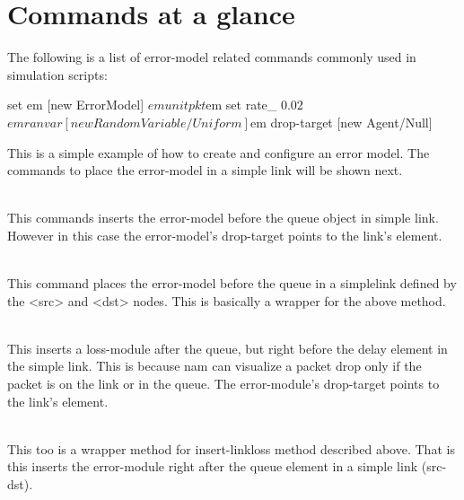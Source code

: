 \section{Commands at a glance}
\label{sec:errmodelcommand}

The following is a list of error-model related commands commonly used in
simulation scripts:

\begin{program}
set em [new ErrorModel]
$em unit pkt
$em set rate_ 0.02
$em ranvar [new RandomVariable/Uniform]
$em drop-target [new Agent/Null]
\end{program}

This is a simple example of how to create and configure an error model.
The commands to place the error-model in a simple link will be shown next.

\begin{flushleft}
\\
This commands inserts the error-model before the queue object in simple link.
However in this case the error-model's drop-target points to the link's
 element.


\\
This command places the error-model before the queue in a simplelink defined
by the <src> and <dst> nodes. This is basically a wrapper for the above method.


\\
This inserts a loss-module after the queue, but right before the delay 
element in the simple link. This is because nam can visualize a packet drop
only if the packet is on the link or in the queue. The error-module's
drop-target points to the link's  element.


\\
This too is a wrapper method for insert-linkloss method described above.
That is this inserts the error-module right after the queue element in a
simple link (src-dst).

\end{flushleft}


